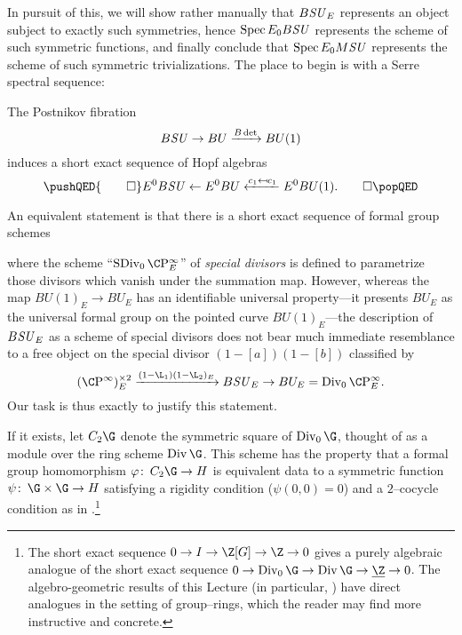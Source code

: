 \noindent In pursuit of this, we will show rather manually that \(B\mathit{SU}_E\) represents an object subject to exactly such symmetries, hence \(\operatorname{Spec} E_0 B\mathit{SU}\) represents the scheme of such symmetric functions, and finally conclude that \(\operatorname{Spec} E_0 M\mathit{SU}\) represents the scheme of such symmetric trivializations.  The place to begin is with a Serre spectral sequence:
\begin{lemma}\label{BSUtoBUtoCPinftyIsSexseq}
The Postnikov fibration \[B\mathit{SU} \to BU \xrightarrow{B\det} BU(1)\] induces a short exact sequence of Hopf algebras
\[\pushQED{\qed}
E^0 B\SU \from E^0 BU \xleftarrow{c_1 \mapsfrom c_1} E^0 BU(1). \qedhere
\popQED\]
\end{lemma}

\noindent An equivalent statement is that there is a short exact sequence of formal group schemes
\begin{center}
\end{center}
where the scheme ``\(\SDiv_0 \CP^\infty_E\)'' of \textit{special divisors} is defined to parametrize those divisors which vanish under the summation map.  However, whereas the map \(BU(1)_E \to BU_E\) has an identifiable universal property---it presents \(BU_E\) as the universal formal group on the pointed curve \(BU(1)_E\)---the description of \(B\mathit{SU}_E\) as a scheme of special divisors does not bear much immediate resemblance to a free object on the special divisor \((1 - [a])(1 - [b])\) classified by \[(\CP^\infty)^{\times 2}_E \xrightarrow{(1 - \L_1)(1 - \L_2)_E} B\SU_E \to BU_E = \Div_0 \CP^\infty_E.\]  Our task is thus exactly to justify this statement.

\begin{definition}\label{DefinitionOfC2G}
If it exists, let \(C_2 \G\) denote the symmetric square of \(\Div_0 \G\), thought of as a module over the ring scheme \(\Div \G\).  This scheme has the property that a formal group homomorphism \(\phi\co C_2 \G \to H\) is equivalent data to a symmetric function \(\psi\co \G \times \G \to H\) satisfying a rigidity condition (\(\psi(0, 0) = 0\)) and a \(2\)--cocycle condition as in .\footnote{The short exact sequence \(0 \to I \to \Z[G] \to \Z \to 0\) gives a purely algebraic analogue of the short exact sequence \(0 \to \Div_0 \G \to \Div \G \to \underline{\Z} \to 0\).  The algebro-geometric results of this Lecture (in particular, ) have direct analogues in the setting of group--rings, which the reader may find more instructive and concrete.}
\end{definition}

